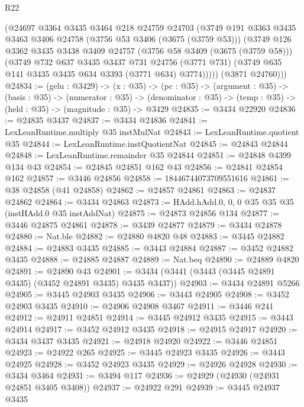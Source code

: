 \begin{lexlean}{R22}
\begin{coremodule}
        (@24697
          @3364
          @3435
          @3464
          @218
          @24759
          @24703
          (@3749
            @191
            @3363
            @3435
            @3463
            @3406
            @24758
            (@3756 @53 @3406 (@3675 (@3759 @53)))
            (@3749
              @126
              @3362
              @3435
              @3438
              @3409
              @24757
              (@3756 @58 @3409 (@3675 (@3759 @58)))
              (@3749
                @732
                @637
                @3435
                @3437
                @731
                @24756
                (@3771 @731)
                (@3749 @635 @141 @3435 @3435 @634 @3393 (@3771 @634) @3774)))))
        (@3871 @24760)))
@24834 := (gelu : @3429) ->
  (x : @35) ->
  (pc : @35) ->
  (argument : @35) ->
  (basis : @35) ->
  (numerator : @35) ->
  (denominator : @35) -> (temp : @35) -> (held : @35) -> (magnitude : @35) -> @3429
@24835 := @3434 @22920
@24836 := @24835 @3437
@24837 := @3434 @24836
@24841 := LexLeanRuntime.multiply @35 instMulNat
@24843 := LexLeanRuntime.quotient @35
@24844 := LexLeanRuntime.instQuotientNat
@24845 := @24843 @24844
@24848 := LexLeanRuntime.remainder @35 @24844
@24851 := @24848 @4399 @134 @43
@24854 := @24845 @24851 @162 @43
@24856 := @24841 @24854 @162
@24857 := @3446 @24856
@24858 := 18446744073709551616
@24861 := @38 @24858 (@41 @24858)
@24862 := @24857 @24861
@24863 := @24837 @24862
@24864 := @3434 @24863
@24873 := HAdd.hAdd.{0, 0, 0} @35 @35 @35 (instHAdd.{0} @35 instAddNat)
@24875 := @24873 @24856 @134
@24877 := @3446 @24875 @24861
@24878 := @3439 @24877
@24879 := @3434 @24878
@24880 := Nat.ble
@24882 := @24880 @4820 @48
@24883 := @3445 @24882
@24884 := @24883 @3435
@24885 := @3443 @24884
@24887 := @3452 @24882 @3435
@24888 := @24885 @24887
@24889 := Nat.beq
@24890 := @24889 @4820
@24891 := @24890 @43
@24901 := @3434 (@3441 (@3443 (@3445 @24891 @3435) (@3452 @24891 @3435) @3435 @3437))
@24903 := @3434 @24891 @5266
@24905 := @3445 @24903 @3435
@24906 := @3443 @24905
@24908 := @3452 @24903 @3435
@24910 := @24906 @24908 @3467
@24911 := @3446 @241
@24912 := @24911 @24851
@24914 := @3445 @24912 @3435
@24915 := @3443 @24914
@24917 := @3452 @24912 @3435
@24918 := @24915 @24917
@24920 := @3434 @3437 @3435
@24921 := @24918 @24920
@24922 := @3446 @24851
@24923 := @24922 @265
@24925 := @3445 @24923 @3435
@24926 := @3443 @24925
@24928 := @3452 @24923 @3435
@24929 := @24926 @24928
@24930 := @3434 @3464
@24931 := @3494 @117
@24936 := @24929 (@24930 (@24931 @24851 @3405 @3408))
@24937 := @24922 @291
@24939 := @3445 @24937 @3435

\end{coremodule}
\end{lexlean}

